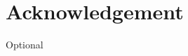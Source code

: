 \documentclass[Thesis.tex]{subfiles}
\begin{document}
\setcounter{section}{5}

\section{Acknowledgement}
\label{sec:ack}

Optional
\end{document}
